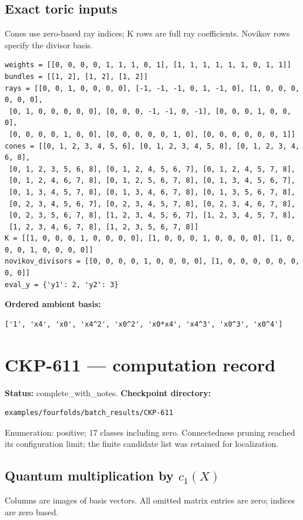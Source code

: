 \documentclass[10pt,a4paper]{article}
\begin{document}
\subsection*{Exact toric inputs}
Cones use zero-based ray indices; K rows are full ray coefficients. Novikov rows specify the divisor basis.

\begin{lstlisting}
weights = [[0, 0, 0, 0, 1, 1, 1, 0, 1], [1, 1, 1, 1, 1, 1, 0, 1, 1]]
bundles = [[1, 2], [1, 2], [1, 2]]
rays = [[0, 0, 1, 0, 0, 0, 0], [-1, -1, -1, 0, 1, -1, 0], [1, 0, 0, 0, 0, 0, 0],
 [0, 1, 0, 0, 0, 0, 0], [0, 0, 0, -1, -1, 0, -1], [0, 0, 0, 1, 0, 0, 0],
 [0, 0, 0, 0, 1, 0, 0], [0, 0, 0, 0, 0, 1, 0], [0, 0, 0, 0, 0, 0, 1]]
cones = [[0, 1, 2, 3, 4, 5, 6], [0, 1, 2, 3, 4, 5, 8], [0, 1, 2, 3, 4, 6, 8],
 [0, 1, 2, 3, 5, 6, 8], [0, 1, 2, 4, 5, 6, 7], [0, 1, 2, 4, 5, 7, 8],
 [0, 1, 2, 4, 6, 7, 8], [0, 1, 2, 5, 6, 7, 8], [0, 1, 3, 4, 5, 6, 7],
 [0, 1, 3, 4, 5, 7, 8], [0, 1, 3, 4, 6, 7, 8], [0, 1, 3, 5, 6, 7, 8],
 [0, 2, 3, 4, 5, 6, 7], [0, 2, 3, 4, 5, 7, 8], [0, 2, 3, 4, 6, 7, 8],
 [0, 2, 3, 5, 6, 7, 8], [1, 2, 3, 4, 5, 6, 7], [1, 2, 3, 4, 5, 7, 8],
 [1, 2, 3, 4, 6, 7, 8], [1, 2, 3, 5, 6, 7, 8]]
K = [[1, 0, 0, 0, 1, 0, 0, 0, 0], [1, 0, 0, 0, 1, 0, 0, 0, 0], [1, 0, 0, 0, 1, 0, 0, 0, 0]]
novikov_divisors = [[0, 0, 0, 0, 1, 0, 0, 0, 0], [1, 0, 0, 0, 0, 0, 0, 0, 0]]
eval_y = {'y1': 2, 'y2': 3}
\end{lstlisting}

\textbf{Ordered ambient basis:}
\begin{lstlisting}
['1', 'x4', 'x0', 'x4^2', 'x0^2', 'x0*x4', 'x4^3', 'x0^3', 'x0^4']
\end{lstlisting}

\clearpage\section*{CKP-611 --- computation record}
\textbf{Status:} complete\_with\_notes.
\textbf{Checkpoint directory:}
\begin{lstlisting}
examples/fourfolds/batch_results/CKP-611
\end{lstlisting}

Enumeration: positive; 17 classes including zero.
Connectedness pruning reached its configuration limit; the finite candidate list was retained for localization.
\subsection*{Quantum multiplication by $c_1(X)$}
Columns are images of basis vectors. All omitted matrix entries are zero; indices are zero based.
\end{document}
